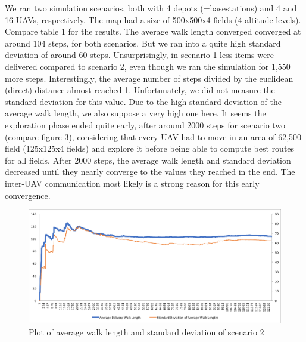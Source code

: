 We ran two simulation scenarios, both with 4 depots (=basestations) and 4 and 16 UAVs, respectively. The map had a size of 500x500x4 fields (4 altitude levels). Compare table 1 for the results. The average walk length converged converged at around 104 steps, for both scenarios. But we ran into a quite high standard deviation of around 60 steps. Unsurprisingly, in scenario 1 less items were delivered compared to scenario 2, even though we ran the simulation for 1,550 more steps. Interestingly, the average number of steps divided by the euclidean (direct) distance almost reached 1. Unfortunately, we did not measure the standard deviation for this value. Due to the high standard deviation of the average walk length, we also suppose a very high one here. It seems the exploration phase ended quite early, after around 2000 steps for scenario two (compare figure 3), considering that every UAV had to move in an area of 62,500 field (125x125x4 fields) and explore it before being able to compute best routes for all fields. After 2000 steps, the average walk length and standard deviation decreased until they nearly converge to the values they reached in the end. The inter-UAV communication most likely is a strong reason for this early convergence. \\
 
 \begin{figure}\label{fig:eval}
 \centering
 \includegraphics[width=\textwidth]{images/graph}
 \caption{Plot of average walk length and standard deviation of scenario 2}
 \end{figure}

